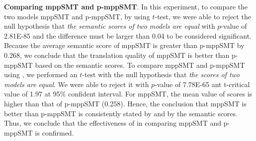 \textbf{Comparing mppSMT and p-mppSMT}. In this experiment, 
to compare the two models mppSMT and p-mppSMT, by using $t$-test, we
were able to reject the null hypothesis that \textit{the semantic
scores of two models are equal} with $p$-value of 2.81E-85 and the difference must be larger than 0.04 to be considered significant. Because the average semantic score of mppSMT
is greater than p-mppSMT by 0.268, we conclude that the translation
quality of mppSMT is better than p-mppSMT based on the semantic
scores.
%
To compare mppSMT and p-mppSMT using {\model}, we performed an
$t$-test with the null hypothesis that \textit{the {\model} scores of
two models are equal}. We were able to reject it with $p$-value of
7.78E-65 ant t-critical value of 1.97 at 95\% confident interval. For mppSMT, the mean value of {\model} scores is higher than
that of p-mppSMT (0.258). Hence, the conclusion that mppSMT is better
than p-mppSMT is consistently stated by {\model} and by the semantic
scores.
Thus, we conclude that the effectiveness of {\model} in comparing
mppSMT and p-mppSMT is confirmed.

